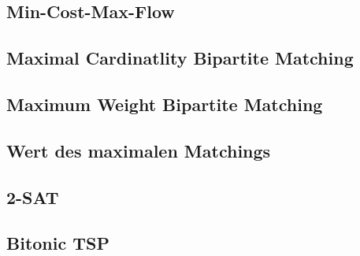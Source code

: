 \subsection{Min-Cost-Max-Flow}


\subsection{Maximal Cardinatlity Bipartite Matching}\label{kuhn}



\subsection{Maximum Weight Bipartite Matching}


\subsection{Wert des maximalen Matchings}


\subsection{2-SAT}


% 

\subsection{Bitonic TSP}


